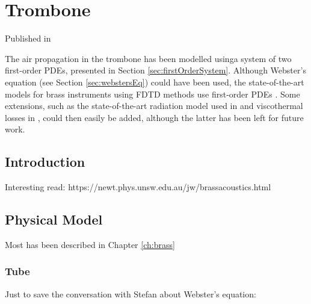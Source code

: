 \chapter{Trombone}\label{ch:trombone}
Published in \citeP[H]

The air propagation in the trombone has been modelled usinga system of two first-order PDEs, presented in Section \ref{sec:firstOrderSystem}. Although Webster's equation (see Section \ref{sec:webstersEq}) could have been used, the state-of-the-art models for brass instruments using FDTD methods use first-order PDEs \cite{Bilbao2016, Harrison2018}. Some extensions, such as the state-of-the-art radiation model used in \cite{Harrison2018} and viscothermal losses in \cite{Bilbao2016}, could then easily be added, although the latter has been left for future work.  


\section{Introduction}
Interesting read: https://newt.phys.unsw.edu.au/jw/brassacoustics.html
\section{Physical Model}
Most has been described in Chapter \ref{ch:brass}

\subsection{Tube}
Just to save the conversation with Stefan about Webster's equation:

